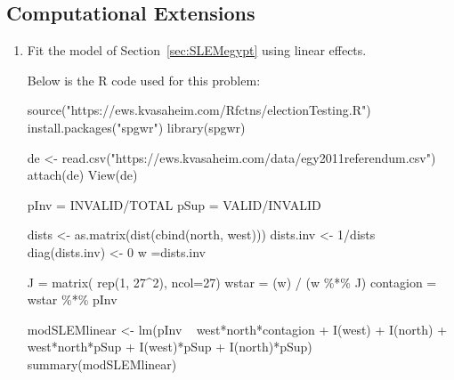 \subsection*{Computational Extensions}
\begin{enumerate}
 \item Fit the model of Section~\ref{sec:SLEMegypt} using linear effects.
\begin{solution}
Below is the R code used for this problem:
\begin{codein}
source("https://ews.kvasaheim.com/Rfctns/electionTesting.R")
install.packages("spgwr")
library(spgwr)

de <- read.csv("https://ews.kvasaheim.com/data/egy2011referendum.csv")
attach(de)
View(de)

pInv = INVALID/TOTAL
pSup = VALID/INVALID

dists <- as.matrix(dist(cbind(north, west)))
dists.inv <- 1/dists
diag(dists.inv) <- 0
w =dists.inv

J = matrix( rep(1, 27^2), ncol=27)
wstar =  (w) / (w \%*\% J)
contagion = wstar \%*\% pInv

modSLEMlinear <- lm(pInv ~ west*north*contagion + I(west) + I(north) + west*north*pSup + I(west)*pSup + I(north)*pSup)
summary(modSLEMlinear)
\end{codein}


\end{solution}
\end{enumerate}
